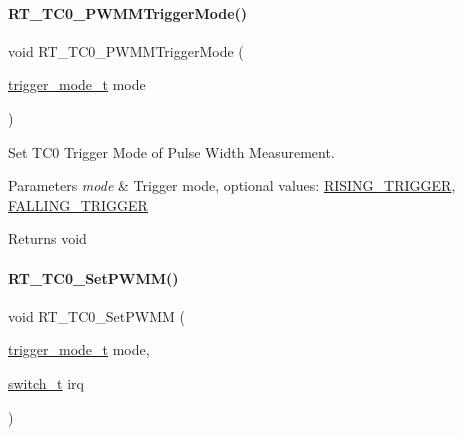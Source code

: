 \paragraph{\texorpdfstring{R\+T\+\_\+\+T\+C0\+\_\+\+P\+W\+M\+M\+Trigger\+Mode()}{RT\_TC0\_PWMMTriggerMode()}}
{\footnotesize\ttfamily void R\+T\+\_\+\+T\+C0\+\_\+\+P\+W\+M\+M\+Trigger\+Mode (\begin{DoxyParamCaption}\item[{\mbox{\hyperlink{a00020_a6d33f21be3f0c5cf91c5d638e8aca086}{trigger\+\_\+mode\+\_\+t}}}]{mode }\end{DoxyParamCaption})\hspace{0.3cm}{\ttfamily [inline]}}



Set T\+C0 Trigger Mode of Pulse Width Measurement. 


\begin{DoxyParams}{Parameters}
{\em mode} & Trigger mode, optional values\+: \mbox{\hyperlink{a00020_a6d33f21be3f0c5cf91c5d638e8aca086a60a109ab1ab372f4e3935064a3f0a26c}{R\+I\+S\+I\+N\+G\+\_\+\+T\+R\+I\+G\+G\+ER}}, \mbox{\hyperlink{a00020_a6d33f21be3f0c5cf91c5d638e8aca086a75134708fc2093222ca5a56acefc5d3f}{F\+A\+L\+L\+I\+N\+G\+\_\+\+T\+R\+I\+G\+G\+ER}} \\
\hline
\end{DoxyParams}
\begin{DoxyReturn}{Returns}
void 
\end{DoxyReturn}
\mbox{\label{a00041_a45059aa93adb7ba8a83c80a4c2132c8b}} 
\paragraph{\texorpdfstring{R\+T\+\_\+\+T\+C0\+\_\+\+Set\+P\+W\+M\+M()}{RT\_TC0\_SetPWMM()}}
{\footnotesize\ttfamily void R\+T\+\_\+\+T\+C0\+\_\+\+Set\+P\+W\+MM (\begin{DoxyParamCaption}\item[{\mbox{\hyperlink{a00020_a6d33f21be3f0c5cf91c5d638e8aca086}{trigger\+\_\+mode\+\_\+t}}}]{mode,  }\item[{\mbox{\hyperlink{a00020_ab43e533f3793920486fb81c580f71564}{switch\+\_\+t}}}]{irq }\end{DoxyParamCaption})\hspace{0.3cm}{\ttfamily [inline]}}



